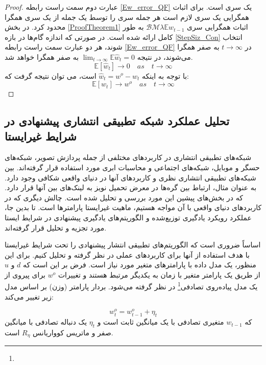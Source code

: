\begin{proof}
عبارت دوم سمت راست رابطه \ref{Ew_error_QF} یک سری است. برای اثبات همگرایی یک سری لازم است هر جمله سری را توسط یک جمله از یک سری همگرا محدود کرد. در بخش \ref{ProofTheorem1} اثبات همگرایی سری $\mathcal{B}\mathcal{M}\lambda \mathbb{E}w_{t-1}$ به طور کامل ارائه شده است.
در صورتی که اندازه گام‌ها در بازه \ref{StepSiz_Con} انتخاب شوند، هر دو عبارت سمت راست رابطه \ref{Ew_error_QF} در $t\rightarrow\infty$ به صفر همگرا می‌شوند، در نتیجه  $\lim_{t\rightarrow\infty}\mathbb{E} \hat{w}_t=0$ به صفر همگرا خواهد شد.
\begin{equation}
	\mathbb{E}\left[\hat{w}_t\right]\rightarrow 0\quad as\quad t\rightarrow \infty
\end{equation}
با توجه به اینکه $\hat{w}_t=w^o-w_t$ است، می توان نتیجه گرفت که:
\begin{equation}
	\mathbb{E}\left[w_{t}\right]\rightarrow w^o\quad as\quad t\rightarrow \infty
\end{equation}

\end{proof}

\subsection{تحلیل عملکرد شبکه تطبیقی انتشاری پیشنهادی در شرایط غیرایستا}
شبکه‌های تطبیقی انتشاری در کاربردهای مختلفی از جمله پردازش تصویر، شبکه‌های حسگر و موبایل، شبکه‌های اجتماعی و محاسبات ابری مورد استفاده قرار گرفته‌اند. بین شبکه‌های تطبیقی انتشاری نظری و کاربردهای آنها در دنیای واقعی شکافی وجود دارد. به عنوان مثال، ارتباط بین گره‌ها در معرض تحمیل نویز به لینک‌های بین آنها قرار دارد. که در بخش‌های پیشین این مورد بررسی و تحلیل شده است. چالش دیگری که در کاربردهای دنیای واقعی با آن مواجه هستیم، ماهیت غیرایستا پارامترها است. تا بدین جا، عملکرد رویکرد یادگیری توزیع‌شده و الگوریتم‌های یادگیری پیشنهادی در شرایط ایستا مورد تجزیه و تحلیل قرار گرفته‌اند. 

اساساً ضروری است که الگوریتم‌های تطبیقی ​​انتشار پیشنهادی را تحت شرایط غیرایستا با هدف استفاده از آنها برای کاربردهای عملی در نظر گرفته و تحلیل کنیم. برای این منظور، یک مدل داده با پارامترهای متغیر مورد نیاز است. فرض بر این است که $d$ و $u$ از طریق یک پارامتر متغیر با زمان به یکدیگر مرتبط هستند و تغییرات $w^o$ برای پیروی از یک مدل پیاده‌روی تصادفی\footnote{} در نظر گرفته می‌شود. بردار پارامتر (وزن) بر اساس مدل زیر تغییر می‌کند: 

\begin{equation}\label{RW_Model}
	w^o_t=w^o_{t-1}+\eta_t
\end{equation}
که $w_{t-1}$ متغیری تصادفی با یک میانگین ثابت  است و $\eta_t$ یک دنباله تصادفی با میانگین صفر و ماتریس کوواریانس $R_{\eta}$ است. 

